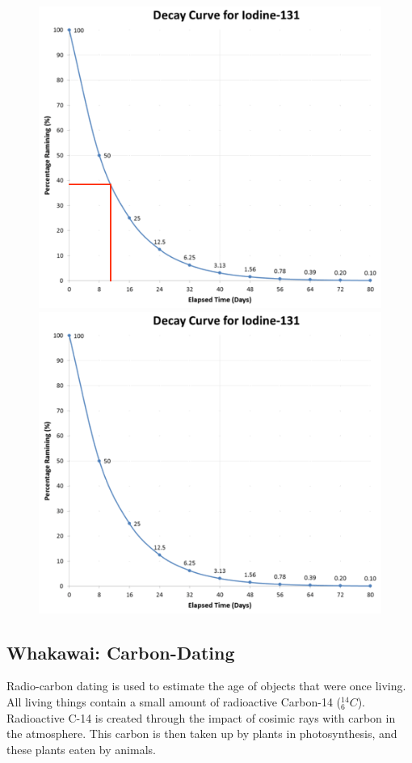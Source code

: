 \documentclass[12pt]{report}
\begin{document}
\begin{figure}[h]
	\centering
	{\includegraphics[width=0.75\linewidth]{iodine-131-answer.png}}
	{\includegraphics[width=0.75\linewidth]{iodine-131.png}}
\end{figure}

\newpage
\subsection{Whakawai: Carbon-Dating}
Radio-carbon dating is used to estimate the age of objects that were once living. All living things contain a small amount of radioactive Carbon-14 (${}^{14}_{6}C$). Radioactive C-14 is created through the impact of cosimic rays with carbon in the atmosphere. This carbon is then taken up by plants in photosynthesis, and these plants eaten by animals.
\end{document}

